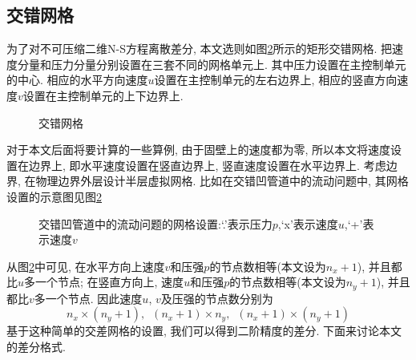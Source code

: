 \documentclass[a4paper,boxed,11pt]{caspset}
\begin{document}
\subsection{交错网格}
为了对不可压缩二维N-S方程离散差分, 本文选则如图\ref{Stagger}所示的矩形交错网格. 把速度分量和压力分量分别设置在三套不同的网格单元上. 其中压力设置在主控制单元的中心. 相应的水平方向速度$u$设置在主控制单元的左右边界上, 相应的竖直方向速度$v$设置在主控制单元的上下边界上.

\begin{figure}[!htb]
\centering

\caption{\label{Stagger}交错网格}
\end{figure}

对于本文后面将要计算的一些算例, 由于固壁上的速度都为零, 所以本文将速度设置在边界上, 即水平速度设置在竖直边界上, 竖直速度设置在水平边界上. 考虑边界, 在物理边界外层设计半层虚拟网格. 比如在交错凹管道中的流动问题中, 其网格设置的示意图见图\ref{Stagger}
\begin{figure}[!htb]
\centering

\caption{\label{Stagger}交错凹管道中的流动问题的网格设置:`.'表示压力$p$,`x'表示速度$u$,`+'表示速度$v$}
\end{figure}
从图\ref{Stagger}中可见, 在水平方向上速度$v$和压强$p$的节点数相等(本文设为$n_x+1$), 并且都比$u$多一个节点; 在竖直方向上, 速度$u$和压强$p$的节点数相等(本文设为$n_y+1$), 并且都比$v$多一个节点. 因此速度$u$, $v$及压强的节点数分别为
\[
n_x\times (n_y+1), \,\,\, (n_x+1)\times n_y, \,\,\, (n_x+1)\times(n_y+1)
\]
基于这种简单的交差网格的设置, 我们可以得到二阶精度的差分. 下面来讨论本文的差分格式.
\end{document}
